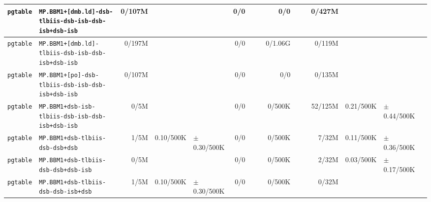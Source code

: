 \begin{tabular}{l l  | r r l | r r l | r r l | r r l l}
     \verb|pgtable| & \verb|MP.BBM1+[dmb.ld]-dsb-tlbiis-dsb-isb-dsb-isb+dsb-isb| &         0/107M &                       &                   &            0/0 &                       &                 &            0/0 &                       &                   &         0/427M &                       &                   & \\ \hline 
     \verb|pgtable| &     \verb|MP.BBM1+[dmb.ld]-tlbiis-dsb-isb-dsb-isb+dsb-isb| &         0/197M &                       &                   &            0/0 &                       &                 &        0/1.06G &                       &                   &         0/119M &                       &                   & \\ \hline 
     \verb|pgtable| &     \verb|MP.BBM1+[po]-dsb-tlbiis-dsb-isb-dsb-isb+dsb-isb| &         0/107M &                       &                   &            0/0 &                       &                 &            0/0 &                       &                   &         0/135M &                       &                   & \\ \hline 
     \verb|pgtable| &      \verb|MP.BBM1+dsb-isb-tlbiis-dsb-isb-dsb-isb+dsb-isb| &           0/5M &                       &                   &            0/0 &                       &                 &         0/500K &                       &                   &        52/125M &             0.21/500K &   $\pm$ 0.44/500K & \\ \hline 
     \verb|pgtable| &                      \verb|MP.BBM1+dsb-tlbiis-dsb-dsb+dsb| &           1/5M &             0.10/500K &   $\pm$ 0.30/500K &            0/0 &                       &                 &         0/500K &                       &                   &          7/32M &             0.11/500K &   $\pm$ 0.36/500K & \\ \hline 
     \verb|pgtable| &                  \verb|MP.BBM1+dsb-tlbiis-dsb-dsb+dsb-isb| &           0/5M &                       &                   &            0/0 &                       &                 &         0/500K &                       &                   &          2/32M &             0.03/500K &   $\pm$ 0.17/500K & \\ \hline 
     \verb|pgtable| &                  \verb|MP.BBM1+dsb-tlbiis-dsb-dsb-isb+dsb| &           1/5M &             0.10/500K &   $\pm$ 0.30/500K &            0/0 &                       &                 &         0/500K &                       &                   &          0/32M &                       &                   & \\ \hline 

\end{tabular}
